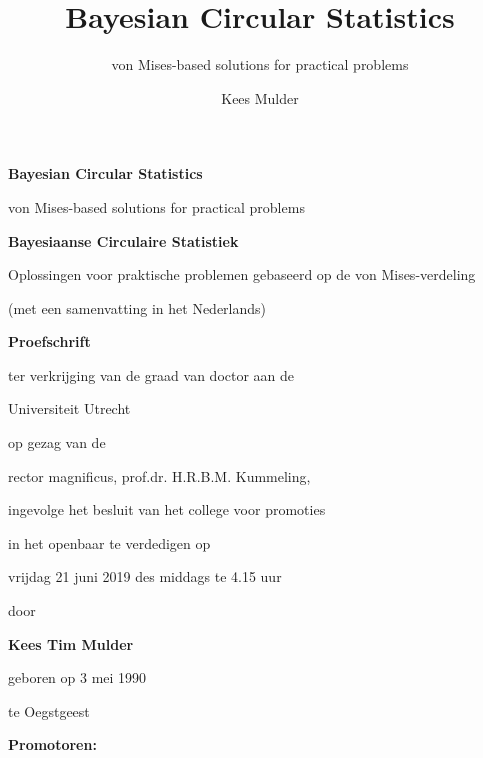 \documentclass[12pt, a4paper]{book}\usepackage[]{graphicx}\usepackage{xcolor}
\title{Bayesian Circular Statistics}
\subtitle{von Mises-based solutions for practical problems}
\author{Kees Mulder}
\begin{document}
\frontmatter

%

\begin{center}
\huge{\textbf{Bayesian Circular Statistics}}

\Large{von Mises-based solutions for practical problems}

\vspace*{1cm}

\large{\textbf{Bayesiaanse Circulaire Statistiek}}

\normalsize{Oplossingen voor praktische problemen gebaseerd op de von Mises-verdeling}

\vspace*{.3cm}

\normalsize{(met een samenvatting in het Nederlands)}



\vspace*{2cm}

\Large{\textbf{Proefschrift}}

\vspace*{3cm}

\normalsize

ter verkrijging van de graad van doctor aan de

Universiteit Utrecht

op gezag van de

rector magnificus, prof.dr. H.R.B.M. Kummeling,

 ingevolge het besluit van het college voor promoties

in het openbaar te verdedigen op

\vspace*{.5cm}
vrijdag 21 juni 2019 des middags te 4.15 uur


\vspace*{1.5cm}

door


\vspace*{1.5cm}

\Large{\textbf{Kees Tim Mulder}}
\normalsize

\vspace*{1cm}

geboren op 3 mei 1990

te Oegstgeest

\end{center}


\newpage

\pagestyle{plain}
\textbf{Promotoren:}
\end{document}
